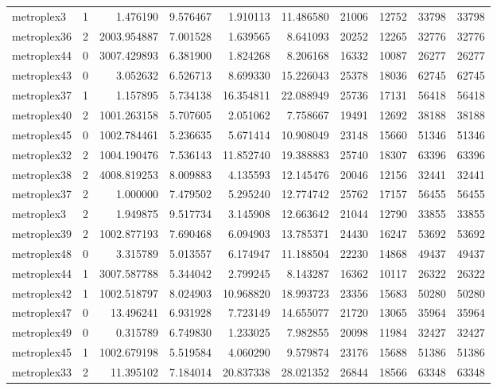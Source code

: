 \begin{longtable}{|l|r|r|r|r|r|r|r|r|r|}
metroplex3 & 1 & 1.476190 & 9.576467 & 1.910113 & 11.486580 & 21006 & 12752 & 33798 & 33798 \\
metroplex36 & 2 & 2003.954887 & 7.001528 & 1.639565 & 8.641093 & 20252 & 12265 & 32776 & 32776 \\
metroplex44 & 0 & 3007.429893 & 6.381900 & 1.824268 & 8.206168 & 16332 & 10087 & 26277 & 26277 \\
metroplex43 & 0 & 3.052632 & 6.526713 & 8.699330 & 15.226043 & 25378 & 18036 & 62745 & 62745 \\
metroplex37 & 1 & 1.157895 & 5.734138 & 16.354811 & 22.088949 & 25736 & 17131 & 56418 & 56418 \\
metroplex40 & 2 & 1001.263158 & 5.707605 & 2.051062 & 7.758667 & 19491 & 12692 & 38188 & 38188 \\
metroplex45 & 0 & 1002.784461 & 5.236635 & 5.671414 & 10.908049 & 23148 & 15660 & 51346 & 51346 \\
metroplex32 & 2 & 1004.190476 & 7.536143 & 11.852740 & 19.388883 & 25740 & 18307 & 63396 & 63396 \\
metroplex38 & 2 & 4008.819253 & 8.009883 & 4.135593 & 12.145476 & 20046 & 12156 & 32441 & 32441 \\
metroplex37 & 2 & 1.000000 & 7.479502 & 5.295240 & 12.774742 & 25762 & 17157 & 56455 & 56455 \\
metroplex3 & 2 & 1.949875 & 9.517734 & 3.145908 & 12.663642 & 21044 & 12790 & 33855 & 33855 \\
metroplex39 & 2 & 1002.877193 & 7.690468 & 6.094903 & 13.785371 & 24430 & 16247 & 53692 & 53692 \\
metroplex48 & 0 & 3.315789 & 5.013557 & 6.174947 & 11.188504 & 22230 & 14868 & 49437 & 49437 \\
metroplex44 & 1 & 3007.587788 & 5.344042 & 2.799245 & 8.143287 & 16362 & 10117 & 26322 & 26322 \\
metroplex42 & 1 & 1002.518797 & 8.024903 & 10.968820 & 18.993723 & 23356 & 15683 & 50280 & 50280 \\
metroplex47 & 0 & 13.496241 & 6.931928 & 7.723149 & 14.655077 & 21720 & 13065 & 35964 & 35964 \\
metroplex49 & 0 & 0.315789 & 6.749830 & 1.233025 & 7.982855 & 20098 & 11984 & 32427 & 32427 \\
metroplex45 & 1 & 1002.679198 & 5.519584 & 4.060290 & 9.579874 & 23176 & 15688 & 51386 & 51386 \\
metroplex33 & 2 & 11.395102 & 7.184014 & 20.837338 & 28.021352 & 26844 & 18566 & 63348 & 63348 \\

\end{longtable}
